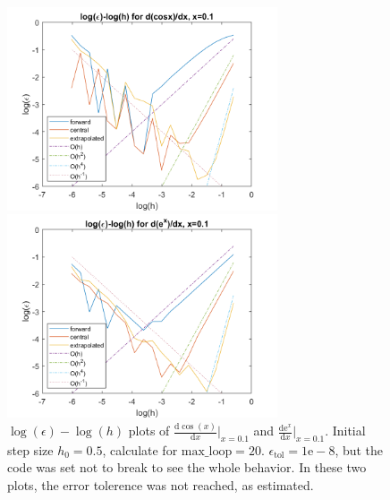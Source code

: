 \documentclass[12pt, graphicx]{article}
\begin{document}
\begin{figure}[ht]
\begin{minipage}{0.48\linewidth}
\centering
\includegraphics[width = 80mm]{dif_cos_1e-1.png}
\end{minipage}
\begin{minipage}{0.48\linewidth}
\centering
\includegraphics[width = 80mm]{dif_exp_1e-1.png}
\end{minipage}
\caption{$\log(\epsilon)-\log(h)$ plots of $\frac{\mathrm{d}\cos(x)}{\mathrm{d}x}|_{x=0.1}$ and $\frac{\mathrm{d}\mathrm{e}^x}{\mathrm{d}x}|_{x=0.1}$. Initial step size $h_0=0.5$, calculate for $\mathrm{max\_loop}=20$. $\epsilon_\mathrm{tol}=1\mathrm{e}-8$, but the code was set not to break to see the whole behavior. In these two plots, the error tolerence was not reached, as estimated.}
\label{fig:dif_0.1}
\end{figure}
\end{document}
